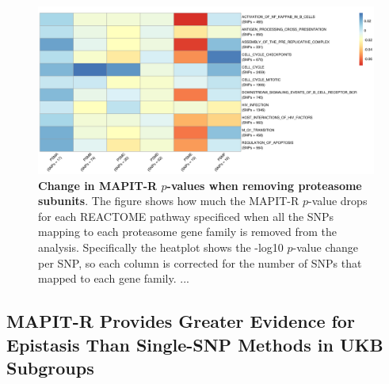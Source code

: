 \documentclass[12pt,a4paper]{article}
\begin{document}
\begin{figure}[htb]
\centering
\includegraphics[scale=.45]{Images/Main/InterPath_Main_Figure_Proteasome_vs1.png}
\caption[TBD]{\textbf{Change in MAPIT-R $p$-values when removing proteasome subunits}. The figure shows how much the MAPIT-R $p$-value drops for each REACTOME pathway specificed when all the SNPs mapping to each proteasome gene family is removed from the analysis. Specifically the heatplot shows the -log10 $p$-value change per SNP, so each column is corrected for the number of SNPs that mapped to each gene family. 
...
}
\label{InterPath-Main-Figure-Proteasome-Heatplot}
\end{figure}










\subsection{MAPIT-R Provides Greater Evidence for Epistasis Than Single-SNP Methods in UKB Subgroups}\label{InterPath-Results-SNPEpistasis}
\end{document}
